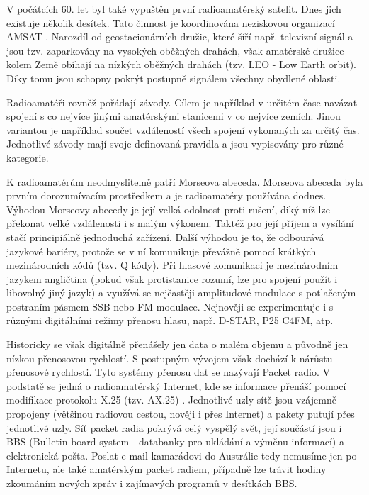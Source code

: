 V počátcích 60. let byl také vypuštěn první radioamatérský satelit. Dnes jich existuje několik desítek.
Tato činnost je koordinována neziskovou organizací AMSAT \cite{amsat}. %
Narozdíl od geostacionárních družic, které šíří např. televizní
signál a jsou tzv. zaparkovány na vysokých oběžných drahách, však amatérské
družice kolem Země obíhají na nízkých oběžných drahách (tzv. LEO - Low Earth
orbit). %
Díky tomu jsou schopny pokrýt postupně signálem všechny obydlené oblasti.

Radioamatéři rovněž pořádají závody. Cílem je například v určitém čase navázat spojení s co nejvíce jinými
amatérskými stanicemi v co nejvíce zemích. Jinou variantou je například součet vzdáleností všech spojení vykonaných za určitý
čas. Jednotlivé závody mají svoje definovaná pravidla a jsou vypisovány pro
různé kategorie.

K radioamatérům neodmyslitelně patří Morseova abeceda. Morseova abeceda byla
prvním dorozumívacím prostředkem a je radioamatéry používána dodnes.
Výhodou Morseovy %
abecedy je její velká odolnost proti rušení, diký níž lze překonat velké vzdálenosti i s malým
výkonem. Taktéž pro její příjem a vysílání stačí principiálně jednoduchá
zařízení. Další výhodou je to, že odbourává
jazykové bariéry, protože se v ní komunikuje
převážně pomocí krátkých mezinárodních kódů (tzv. Q kódy). Při hlasové komunikaci
je mezinárodním jazykem angličtina (pokud však protistanice rozumí, lze pro
spojení použít i libovolný jiný jazyk) a využívá se nejčastěji amplitudové
modulace s potlačeným postraním pásmem SSB
nebo FM modulace. Nejnověji se experimentuje i s různými digitálními režimy
přenosu hlasu, např. D-STAR, %
P25 C4FM, atp.

Historicky se však digitálně přenášely jen data o malém objemu a původně jen nízkou
přenosovou rychlostí. S postupným vývojem však dochází k nárůstu přenosové
rychlosti. Tyto systémy přenosu dat se nazývají Packet radio. V podstatě se jedná o
radioamatérský Internet, kde se informace přenáší pomocí modifikace protokolu
X.25 (tzv. AX.25) \cite{ax25}. %
Jednotlivé uzly sítě jsou vzájemně propojeny (většinou radiovou cestou, nověji i
přes Internet) a pakety putují přes jednotlivé uzly.
Síť packet radia pokrývá celý vyspělý svět, její součástí jsou i BBS (Bulletin
board system - databanky pro ukládání a výměnu informací) a
elektronická pošta. Poslat e-mail kamarádovi do Austrálie tedy nemusíme jen po Internetu,
ale také amatérským packet radiem, případně lze trávit hodiny zkoumáním nových zpráv i
zajímavých programů v desítkách BBS.

